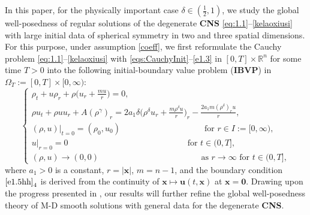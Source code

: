 \documentclass[11pt,reqno]{amsart}
\numberwithin{rk}{section}
\numberwithin{prop}{section}
\numberwithin{mydef}{section}
\numberwithin{lem}{section}
\numberwithin{equation}{section}
\numberwithin{thm}{section}
\begin{document}
In this paper, for the physically important case  $\delta \in (\frac{1}{2},1)$, we study  the global well-posedness of regular solutions of the degenerate \textbf{CNS} \eqref{eq:1.1}--\eqref{kelaoxiusi} with large initial data of spherical symmetry in two and three spatial dimensions. 
For this purpose, under assumption \eqref{coeff},
we first reformulate the Cauchy problem \eqref{eq:1.1}--\eqref{kelaoxiusi} with \eqref{eqs:CauchyInit}--\eqref{e1.3} in $[0,T]\times \mathbb{R}^n$ for some time $T>0$  into the following initial-boundary value problem ({\rm \textbf{IBVP}}) in $\Omega_T:=[0,T]\times [0,\infty)$:
\begin{equation}\label{e1.5hh}
\begin{cases}
\displaystyle 
\rho_t+u\rho_r+\rho\big(u_r+\frac{m u}{r}\big)=0,\\[3pt]
\displaystyle
\rho u_t+\rho uu_r+A(\rho^\gamma)_r=2a_1\delta\big(\rho^\delta u_r+\frac{m\rho^\delta u}{r} \big)_r-\frac{2a_1 m(\rho^\delta)_r u}{r},\\[7pt]
\displaystyle
(\rho, u)|_{t=0}=(\rho_0, u_0 )\qquad\qquad \qquad \qquad \qquad \text{for  $r\in I:=[0,\infty)$},\\[7pt]
\displaystyle
u|_{r=0}=0\qquad\qquad\qquad \qquad \qquad\qquad \
\qquad  \text{for $t\in(0,T]$},\\[7pt]
\displaystyle
(\rho,u)\to \left(0,0\right) \qquad\qquad \, \qquad \qquad  \qquad 
\qquad \text{as $r\to \infty$ \ for $t\in (0,T]$},
\end{cases}
\end{equation}
where $a_1>0$ is a constant,  $r=|\boldsymbol{x}|$, $m=n-1$, and the boundary condition $\eqref{e1.5hh}_4$ is derived from the continuity of $\boldsymbol{x}\mapsto \boldsymbol{u}(t,\boldsymbol{x})$ at $\boldsymbol{x}=\boldsymbol{0}$. Drawing upon the progress presented in \cite{GLZ,CZZ1,CZZ2,sz333}, our results will further refine  the global well-posedness theory of M-D smooth  solutions with general data for the degenerate \textbf{CNS}.
\end{document}
